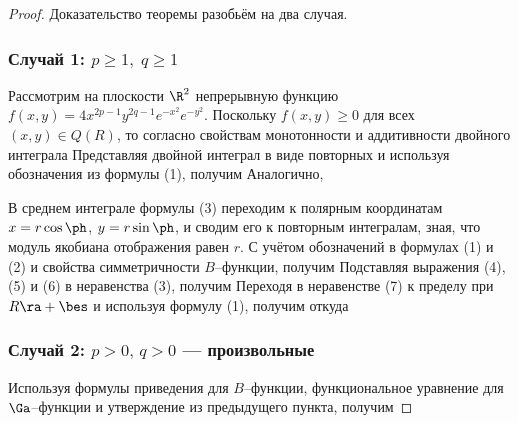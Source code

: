 \documentclass[a4paper]{article}
\begin{document}
\begin{proof}
Доказательство теоремы разобьём на два случая.
\subsubsection{Случай 1: $p\ge1,\;q\ge1$}

Рассмотрим на плоскости $\R^2$ непрерывную функцию
$f(x,y)=4x^{2p-1}y^{2q-1} e^{-x^2}e^{-y^2}$. Поскольку $f(x,y)\ge0$
для всех $(x,y)\in Q(R)$, то согласно свойствам монотонности и
аддитивности двойного интеграла  Представляя двойной интеграл в
виде повторных и используя обозначения из формулы (1), получим
Аналогично,

В среднем интеграле формулы (3) переходим к полярным координатам
$x=r\cos\ph$, $y=r\sin\ph$, и сводим его к повторным интегралам,
зная, что модуль якобиана отображения равен $r$. С учётом
обозначений в формулах (1) и (2) и свойства симметричности
$B$--функции, получим  Подставляя выражения (4), (5) и (6) в неравенства (3),
получим  Переходя в
неравенстве (7) к пределу при $R\ra+\bes$ и используя формулу (1),
получим 
откуда 

\subsubsection{Случай 2: $p>0,\,q>0$ --- произвольные}
Используя формулы приведения для $B$--функции, функциональное
уравнение для $\Ga$--функции и утверждение из предыдущего пункта,
получим 

\end{proof}
\end{document}
